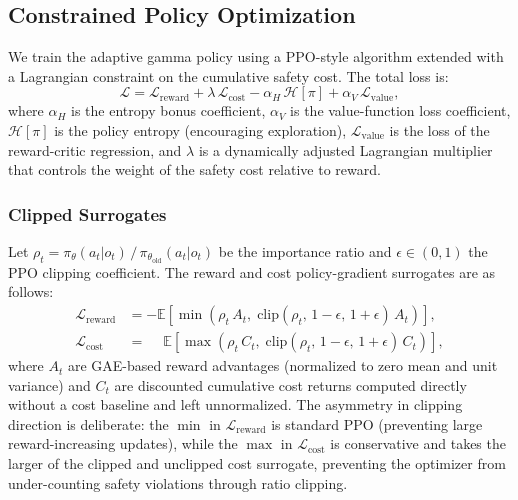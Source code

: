 \subsection{Constrained Policy Optimization}

We train the adaptive gamma policy using a PPO-style algorithm extended with a Lagrangian constraint on the cumulative safety cost. The total loss is:
\begin{equation}
\mathcal{L} =
\mathcal{L}_{\text{reward}}
+ \lambda\,\mathcal{L}_{\text{cost}}
- \alpha_H\,\mathcal{H}[\pi]
+ \alpha_V\,\mathcal{L}_{\text{value}},
\end{equation}
where $\alpha_H$ is the entropy bonus coefficient, $\alpha_V$ is the value-function loss coefficient, $\mathcal{H}[\pi]$ is the policy entropy (encouraging exploration), $\mathcal{L}_{\text{value}}$ is the loss of the reward-critic regression, and $\lambda$ is a dynamically adjusted Lagrangian multiplier that controls the weight of the safety cost relative to reward.


\subsubsection{Clipped Surrogates}

Let $\rho_t = \pi_\theta(a_t | o_t)\,/\,\pi_{\theta_{\text{old}}}(a_t | o_t)$ be the importance ratio and $\epsilon \in (0,1)$ the PPO clipping coefficient. The reward and cost policy-gradient surrogates are as follows:
\begin{align}
\mathcal{L}_{\text{reward}} &=
-\mathbb{E}\!\left[\min\!\left(\rho_t\, A_t,\;\text{clip}(\rho_t,\,1{-}\epsilon,\,1{+}\epsilon)\,A_t\right)\right], \\
\mathcal{L}_{\text{cost}} &=
\phantom{-}\mathbb{E}\!\left[\max\!\left(\rho_t\, C_t,\;\text{clip}(\rho_t,\,1{-}\epsilon,\,1{+}\epsilon)\,C_t\right)\right],
\end{align}
where $A_t$ are GAE-based reward advantages (normalized to zero mean and unit variance) and $C_t$ are discounted cumulative cost returns computed directly without a cost baseline and left unnormalized. The asymmetry in clipping direction is deliberate: the $\min$ in $\mathcal{L}_{\text{reward}}$ is standard PPO (preventing large reward-increasing updates), while the $\max$ in $\mathcal{L}_{\text{cost}}$ is conservative and takes the larger of the clipped and unclipped cost surrogate, preventing the optimizer from under-counting safety violations through ratio clipping.

